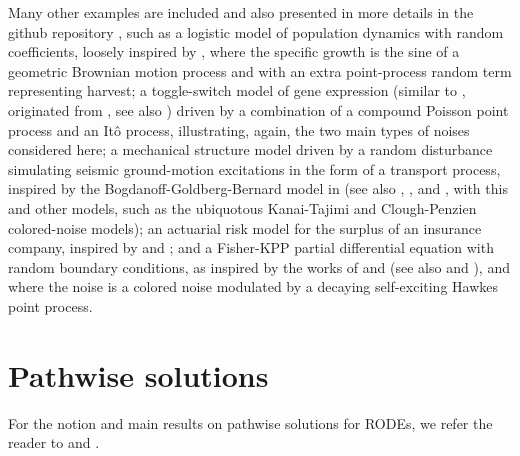 \documentclass[reqno,12pt]{amsart}
\theoremstyle{plain} %
\theoremstyle{definition} %
\begin{document}
Many other examples are included and also presented in more details in the github repository \cite{RODEConvEM2023}, such as a logistic model of population dynamics with random coefficients, loosely inspired by \cite[Section 15.2]{HanKloeden2017}, where the specific growth is the sine of a geometric Brownian motion process and with an extra point-process random term representing harvest; a toggle-switch model of gene expression (similar to \cite[Section 7.8]{Asai2016}, originated from \cite{VerdCrombachJaeger2014}, see also \cite{StrasserTheisMarr2012}) driven by a combination of a compound Poisson point process and an It\^o process, illustrating, again, the two main types of noises considered here; a mechanical structure model driven by a random disturbance simulating seismic ground-motion excitations in the form of a transport process, inspired by the Bogdanoff-Goldberg-Bernard model in \cite{BogdanoffGoldbergBernard1961} (see also \cite[Chapter 18]{NeckelRupp2013}, \cite{HousnerJenning1964}, and \cite{Kanai1957}, with this and other models, such as the ubiquotous Kanai-Tajimi and Clough-Penzien colored-noise models); an actuarial risk model for the surplus of an insurance company, inspired by \cite{GerberShiu1998} and \cite{BrigoMercurio2006}; and a Fisher-KPP partial differential equation with random boundary conditions, as inspired by the works of \cite{SalakoShen2020} and \cite{FreidlinWentzell1992} (see also \cite{Fisher1937} and \cite{KPP1937}), and where the noise is a colored noise modulated by a decaying self-exciting Hawkes point process.

\section{Pathwise solutions}
\label{secpathwisesolution}

For the notion and main results on pathwise solutions for RODEs, we refer the reader to \cite[Section 2.1]{HanKloeden2017} and \cite[Section 3.3]{NeckelRupp2013}.
\end{document}
